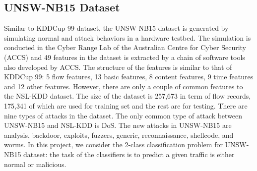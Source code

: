 \subsection{UNSW-NB15 Dataset}
Similar to KDDCup 99 dataset, the UNSW-NB15 dataset is generated by simulating normal
and attack behaviors in a hardware testbed.
The simulation is conducted in the Cyber Range Lab of the Australian Centre for Cyber Security (ACCS)
and 49 features in the dataset is extracted by a chain of software tools also developed by ACCS.
The structure of the features is similar to that of KDDCup 99: 5 flow features,
13 basic features, 8 content features, 9 time features and 12 other features.
However, there are only a couple of common features to the NSL-KDD dataset.
The size of the dataset is 257,673 in term of flow records, 175,341 of which are used for
training set and the rest are for testing.
There are nine types of attacks in the dataset.
The only common type of attack between UNSW-NB15 and NSL-KDD is DoS.
The new attacks in UNSW-NB15 are analysis, backdoor, exploits, fuzzers, generic, reconnaissance, shellcode, and worms.
In this project, we consider the 2-class classification problem for UNSW-NB15 dataset: the
task of the classifiers is to predict a given traffic is either normal or malicious.
